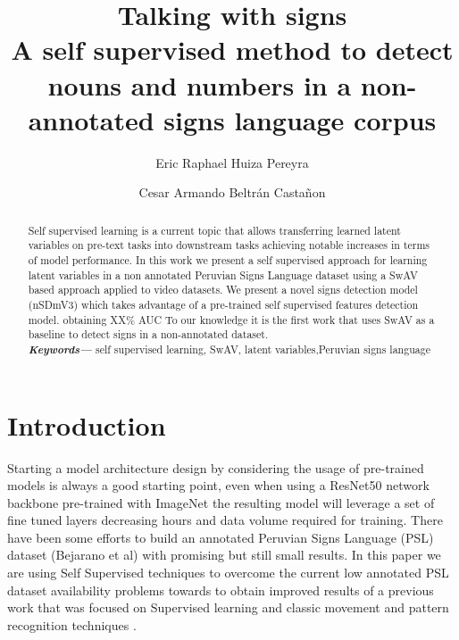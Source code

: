 \documentclass[twocolumn,conference]{article}
\providecommand{\keywords}[1]
{
  \small	
  \textbf{\textit{Keywords---}} #1
}
\begin{document}
\author[1]{Eric Raphael Huiza Pereyra}

\author[2]{Cesar Armando Beltrán Castañon}

\title{%
	\vspace{-2.0cm}
	\textbf{Talking with signs} \\	
	\Large \textbf{A self supervised method to detect nouns and numbers in a non-annotated signs language corpus}
}

\maketitle
    
\begin{abstract}
Self supervised learning is a current topic that allows transferring learned latent variables on pre-text tasks into downstream tasks achieving notable increases in terms of model performance. In this work we present a self supervised approach for learning latent variables in a non annotated Peruvian Signs Language dataset using a SwAV based approach applied to video datasets. We present a novel signs detection model (nSDmV3) which takes advantage of a pre-trained self supervised features detection model. obtaining XX\% AUC To our knowledge it is the first work that uses SwAV as a baseline to detect signs in a non-annotated dataset. 
\\
\keywords{self supervised learning, SwAV, latent variables,Peruvian signs language}
\end{abstract}
\section{Introduction}\label{Introduction}
Starting a model architecture design by considering the usage of pre-trained models is always a good starting point,  even when using a ResNet50 network backbone pre-trained with ImageNet the resulting model will leverage a set of fine tuned layers decreasing hours and data volume required for training. There have been some efforts to build an annotated Peruvian Signs Language (PSL) dataset (Bejarano et al) with promising but still small results. In this paper we are using Self Supervised techniques to overcome the current low annotated PSL dataset availability problems towards to obtain improved results of a previous work that was focused on Supervised learning and classic movement and pattern recognition techniques \cite{Pereyra_2021_CVPR}.  
\end{document}
